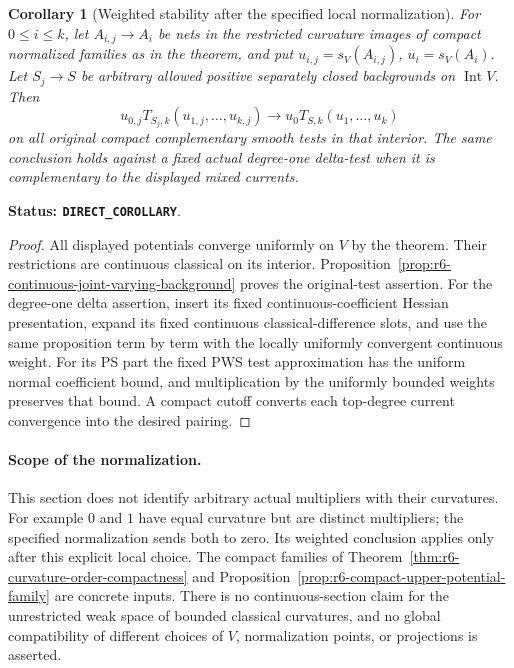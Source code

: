 \documentclass[11pt,a4paper]{article}
\numberwithin{equation}{section}
\newtheorem{corollary}[theorem]{Corollary}
\theoremstyle{definition}
\theoremstyle{remark}
\begin{document}
\begin{corollary}[Weighted stability after the specified local normalization]
\label{cor:r6-gauged-weighted-weak-stability}
For $0\le i\le k$, let $A_{i,j}\to A_i$ be nets in the restricted
curvature images of compact normalized families as in the theorem,
and put $u_{i,j}=s_V(A_{i,j})$, $u_i=s_V(A_i)$. Let $S_j\to S$
be arbitrary allowed positive separately closed backgrounds on
$\operatorname{Int}V$. Then
\[
 u_{0,j}T_{S_j,k}(u_{1,j},\ldots,u_{k,j})
             \longrightarrow u_0T_{S,k}(u_1,\ldots,u_k)
\]
on all original compact complementary smooth tests in that interior.
The same conclusion holds against a fixed actual degree-one delta-test
when it is complementary to the displayed mixed currents.
\end{corollary}

\noindent\textbf{Status: \texttt{DIRECT\_COROLLARY}}.

\begin{proof}
All displayed potentials converge uniformly on $V$ by the theorem.
Their restrictions are continuous classical on its interior.
Proposition~\ref{prop:r6-continuous-joint-varying-background} proves
the original-test assertion. For the degree-one delta assertion, insert
its fixed continuous-coefficient Hessian presentation, expand its fixed
continuous classical-difference slots, and use the same proposition
term by term with the locally uniformly convergent continuous weight.
For its PS part the fixed PWS test approximation has the uniform normal
coefficient bound, and multiplication by the uniformly bounded weights
preserves that bound. A compact cutoff converts each top-degree current
convergence into the desired pairing.
\end{proof}

\paragraph{Scope of the normalization.}
This section does not identify arbitrary actual multipliers with their
curvatures. For example $0$ and $1$ have equal curvature but are distinct
multipliers; the specified normalization sends both to zero. Its weighted
conclusion applies only after this explicit local choice. The compact
families of Theorem~\ref{thm:r6-curvature-order-compactness} and
Proposition~\ref{prop:r6-compact-upper-potential-family} are concrete
inputs. There is no continuous-section claim for the unrestricted weak
space of bounded classical curvatures, and no global compatibility of
different choices of $V$, normalization points, or projections is asserted.
\end{document}
